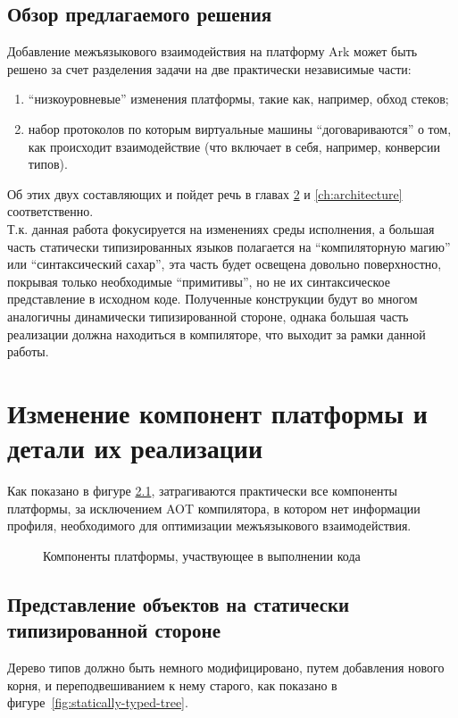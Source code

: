 \documentclass[times,specification,annotation]{itmo-student-thesis}
\begin{document}
\section{Обзор предлагаемого решения}
Добавление межъязыкового взаимодействия на платформу Ark может быть решено за счет разделения задачи на две практически независимые части:\\
\begin{enumerate}
	\item ``низкоуровневые'' изменения платформы, такие как, например, обход стеков;
	\item набор протоколов по которым виртуальные машины ``договариваются'' о том, как происходит взаимодействие (что включает в себя, например, конверсии типов).
\end{enumerate}
Об этих двух составляющих и пойдет речь в главах \ref{ch:platform} и \ref{ch:architecture} соответственно.\\
Т.к. данная работа фокусируется на изменениях среды исполнения, а большая часть статически типизированных языков полагается на ``компиляторную магию'' или ``синтаксический сахар'', эта часть будет освещена довольно поверхностно, покрывая только необходимые ``примитивы'', но не их синтаксическое представление в исходном коде. Полученные конструкции будут во многом аналогичны динамически типизированной стороне, однака большая часть реализации должна находиться в компиляторе, что выходит за рамки данной работы.

\chapterconclusion

\chapter{Изменение компонент платформы и детали их реализации}\label{ch:platform}
Как показано в фигуре \ref{fig:all-components}, затрагиваются практически все компоненты платформы, за исключением AOT компилятора, в котором нет информации профиля, необходимого для оптимизации межъязыкового взаимодействия.
\begin{figure}[!h]
	\caption{Компоненты платформы, участвующее в выполнении кода}\label{fig:all-components}
	\centering
	
\end{figure}

\section{Представление объектов на статически типизированной стороне}
Дерево типов должно быть немного модифицировано, путем добавления нового корня, и переподвешиванием к нему старого, как показано в фигуре~\ref{fig:statically-typed-tree}.
\end{document}
